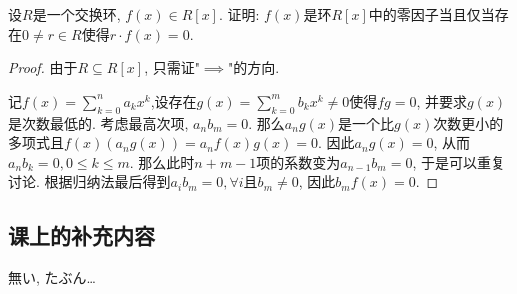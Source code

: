 \documentclass{../solutions-cn}
\begin{document}
\begin{exercise}[习题2.3.8]
    设$R$是一个交换环, $f(x) \in R[x]$. 证明: $f(x)$是环$R[x]$中的零因子当且仅当存在$0 \neq r \in R$使得$r \cdot f(x) = 0$.
\end{exercise}

\begin{proof}
    由于$R \subseteq R[x]$, 只需证"$\implies$"的方向.

    记$f(x) = \sum_{k = 0}^{n} a_kx^k$,设存在$g(x) = \sum_{k = 0}^{m} b_kx^k \neq 0$使得$fg = 0$, 并要求$g(x)$是次数最低的. 考虑最高次项, $a_nb_m = 0$. 那么$a_ng(x)$是一个比$g(x)$次数更小的多项式且$f(x)(a_ng(x)) = a_nf(x)g(x) = 0$. 因此$a_ng(x) = 0$, 从而$a_nb_k = 0, 0 \leqslant k \leqslant m$. 那么此时$n + m - 1$项的系数变为$a_{n - 1}b_m = 0$, 于是可以重复讨论. 根据归纳法最后得到$a_ib_m = 0, \forall i$且$b_m \neq 0$, 因此$b_mf(x) = 0$.
\end{proof}

\subsection*{课上的补充内容}
    無い, たぶん\dots
\end{document}
